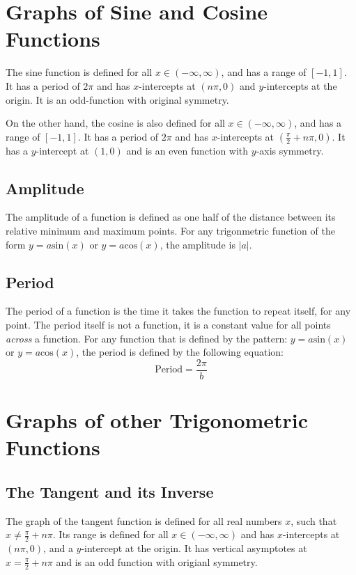 \section{Graphs of Sine and Cosine Functions}
The sine function is defined for all $x\in(-\infty,\infty)$, and has a range of
$[-1,1]$.  It has a period of $2\pi$ and has $x$-intercepts at $(n\pi, 0)$ and
$y$-intercepts at the origin.  It is an odd-function with original symmetry.

On the other hand, the cosine is also defined for all $x\in(-\infty,\infty)$,
and has a range of $[-1,1]$.  It has a period of $2\pi$ and has $x$-intercepts
at $(\frac{\pi}{2}+n\pi,0)$.  It has a $y$-intercept at $(1,0)$ and is an even
function with $y$-axis symmetry.

\subsection{Amplitude}
The amplitude of a function is defined as one half of the distance between its
relative minimum and maximum points.  For any trigonmetric function of the form
$y=a\text{sin}(x)$ or $y=a\text{cos}(x)$, the amplitude is $|a|$.

\subsection{Period}
The period of a function is the time it takes the function to repeat itself, for
any point.  The period itself is not a function, it is a constant value for all
points \textit{across} a function.  For any function that is defined by the
pattern: $y=a\text{sin}(x)$ or $y=a\text{cos}(x)$, the period is defined by the
following equation:
\begin{equation}
  \text{Period}=\frac{2\pi}{b}
\end{equation}

\section{Graphs of other Trigonometric Functions}

\subsection{The Tangent and its Inverse}
The graph of the tangent function is defined for all real numbers $x$, such that
$x\neq\frac{\pi}{2}+n\pi$.  Its range is defined for all
$x\in(-\infty,\infty)$ and has $x$-intercepts at $(n\pi,0)$, and a
$y$-intercept at the origin.  It has vertical asymptotes at
$x=\frac{\pi}{2}+n\pi$ and is an odd function with origianl symmetry.

